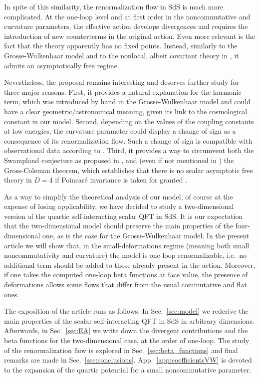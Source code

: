 \documentclass[a4paper,10pt]{amsart}
\begin{document}
In spite of this similarity, the renormalization flow in SdS is much more complicated.
At the one-loop level and at first order in the noncommutative and curvature parameters,
the effective action develops divergences and requires the introduction of new counterterms in the original action.
Even more relevant is the fact that the theory apparently has no fixed points.
{Instead, similarly to the Grosse-Wulkenhaar model and to the nonlocal, albeit covariant theory in \cite{Trinchero:2018gwe,Trinchero:2012zn}, it admits an asymptotically free regime.}

Nevertheless, the proposal remains interesting and deserves further study for three major reasons.
First, it provides a natural explanation for the harmonic term,
which was introduced by hand in the Grosse-Wulkenhaar model and could have a clear geometric/astronomical meaning,
given its link to the cosmological constant in our model.
Second, depending on the values of the coupling constants at low energies,
the curvature parameter could display a change of sign as a consequence of its renormalization flow.
Such a change of sign is compatible with observational data according to \cite{Akarsu:2019hmw,Akarsu:2020yqa}.
Third, it provides a way to circumvent both the Swampland conjecture as proposed in \cite{deAlwis:2019aud},
and (even if not mentioned in \cite{Franchino-Vinas:2019nqy}) the Gross-Coleman theorem,
which establishes that there is no scalar asymptotic free theory in $D=4$ if Poincaré invariance is taken for granted \cite{Coleman:1973sx}.

As a way to simplify the theoretical analysis of our model, of course at the expense of losing applicability,
we have decided to study a two-dimensional version of the quartic self-interacting scalar QFT in SdS.
It is our expectation that the two-dimensional model should preserve the main properties of the four-dimensional one,
as is the case for the Grosse-Wulkenhaar model.
In the present article we will show that, in the small-deformations  regime (meaning both small noncommutativity and curvature)
the model is one-loop renormalizable,
i.e.~no additional term should be added to those already present in the action.
Moreover, if one takes the computed one-loop beta functions at face value,
the presence of deformations allows some flows that differ from the usual commutative and flat ones.


The exposition of the article runs as follows.
In Sec.~\ref{sec:model} we rederive the main properties of the scalar self-interacting QFT in SdS in arbitrary dimensions.
Afterwards, in Sec.~\ref{sec:EA} we write down the divergent contributions and the beta functions for the two-dimensional case,
at the order of one-loop.
The study of the renormalization flow is explored in Sec.~\ref{sec:beta_functions}
and final remarks are made in Sec.~\ref{sec:conclusions}.
App.~\ref{app:coefficientsVW} is devoted to the expansion of the quartic potential for a small noncommutative parameter.
\end{document}
